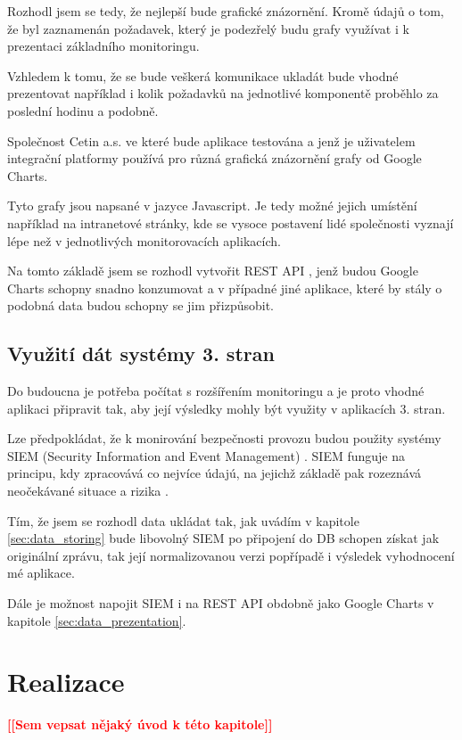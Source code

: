 \documentclass[thesis=M,czech]{FITthesis}[2012/10/20]
\newcommand{\todo}[1]{\textcolor{red}{\textbf{[[#1]]}}}
\begin{document}
		Rozhodl jsem se tedy, že nejlepší bude grafické znázornění. Kromě údajů o tom, že byl zaznamenán požadavek, který je podezřelý budu grafy využívat i k prezentaci základního monitoringu. 
		
		Vzhledem k tomu, že se bude veškerá komunikace ukladát bude vhodné prezentovat například i kolik požadavků na jednotlivé komponentě proběhlo za poslední hodinu a podobně.
		
		Společnost Cetin a.s. \cite{cetin} ve které bude aplikace testována a jenž je uživatelem integrační platformy používá pro různá grafická znázornění grafy od Google Charts\cite{googleCharts}. 
		
		Tyto grafy jsou napsané v jazyce Javascript. Je tedy možné jejich umístění například na intranetové stránky, kde se vysoce postavení lidé společnosti vyznají lépe než v jednotlivých monitorovacích aplikacích.
		
		Na tomto základě jsem se rozhodl vytvořit REST API \cite{rest}, jenž budou Google Charts schopny snadno konzumovat a v případné jiné aplikace, které by stály o podobná data budou schopny se jim přizpůsobit.
		
	\section{Využití dát systémy 3. stran}
		Do budoucna je potřeba počítat s rozšířením monitoringu a je proto vhodné aplikaci připravit tak, aby její výsledky mohly být využity v aplikacích 3. stran.
		
		Lze předpokládat, že k monirování bezpečnosti provozu budou použity systémy SIEM (Security Information and Event Management) \cite{siem}.
		SIEM funguje na principu, kdy zpracovává co nejvíce údajú, na jejichž základě pak rozeznává neočekávané situace a rizika \cite{howDesSiemWork}.
		
		Tím, že jsem se rozhodl data ukládat tak, jak uvádím v kapitole \ref{sec:data_storing} bude libovolný SIEM po připojení do DB schopen získat jak originální zprávu, tak její normalizovanou verzi popřípadě i výsledek vyhodnocení mé aplikace.
		
		Dále je možnost napojit SIEM i na REST API obdobně jako Google Charts v kapitole \ref{sec:data_prezentation}.
		
\chapter{Realizace}
	\todo{Sem vepsat nějaký úvod k této kapitole}
	
\end{document}
